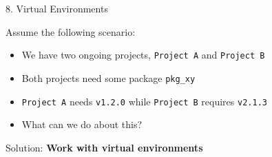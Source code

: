 








\begin{vbframe}{8. Virtual Environments}

\vfill

Assume the following scenario:

\begin{itemize}
	\item We have two ongoing projects, \texttt{Project A} and \texttt{Project B}
	\item Both projects need some package \texttt{pkg\_xy}
	\item \texttt{Project A} needs \texttt{v1.2.0} while \texttt{Project B} requires \texttt{v2.1.3}
	\item What can we do about this?
\end{itemize}

\vspace{.2cm}

Solution: \textbf{Work with virtual environments}


\vfill

\end{vbframe}

